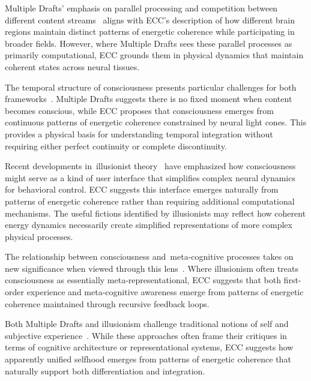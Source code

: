 Multiple Drafts' emphasis on parallel processing and competition between different content streams~\cite{Dennett1992, Dennett1991} aligns with ECC's description of how different brain regions maintain distinct patterns of energetic coherence while participating in broader fields. However, where Multiple Drafts sees these parallel processes as primarily computational, ECC grounds them in physical dynamics that maintain coherent states across neural tissues.

The temporal structure of consciousness presents particular challenges for both frameworks~\cite{Blackmore2002, Sergent2004}. Multiple Drafts suggests there is no fixed moment when content becomes conscious, while ECC proposes that consciousness emerges from continuous patterns of energetic coherence constrained by neural light cones. This provides a physical basis for understanding temporal integration without requiring either perfect continuity or complete discontinuity.

Recent developments in~illusionist theory~\cite{Humphrey2011, Graziano2019} have emphasized how consciousness might serve as a kind of user interface that simplifies complex neural dynamics for behavioral control. ECC suggests this interface emerges naturally from patterns of energetic coherence rather than requiring additional computational mechanisms. The useful fictions identified by illusionists may reflect how coherent energy dynamics necessarily create simplified representations of more complex physical processes.

The relationship between consciousness and~meta-cognitive processes takes on new significance when viewed through this lens~\cite{Rey1995, Brown2019}. Where illusionism often treats consciousness as essentially meta-representational, ECC suggests that both first-order experience and meta-cognitive awareness emerge from patterns of energetic coherence maintained through recursive feedback loops.

Both Multiple Drafts and illusionism challenge traditional notions of self and subjective experience~\cite{Thompson2014, Metzinger2003}. While these approaches often frame their critiques in terms of cognitive architecture or representational systems, ECC suggests how apparently unified selfhood emerges from patterns of energetic coherence that naturally support both differentiation and integration.

